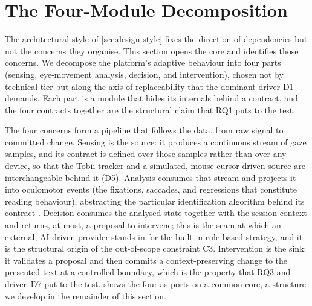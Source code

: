 \section{The Four-Module Decomposition}
\label{sec:design-modules}

The architectural style of \cref{sec:design-style} fixes the direction of dependencies but not the concerns they organise.
This section opens the core and identifies those concerns.
We decompose the platform's adaptive behaviour into four parts (sensing, eye-movement analysis, decision, and intervention), chosen not by technical tier but along the axis of replaceability that the dominant driver D1 demands.
Each part is a module that hides its internals behind a contract, and the four contracts together are the structural claim that RQ1 puts to the test.

The four concerns form a pipeline that follows the data, from raw signal to committed change.
Sensing is the source: it produces a continuous stream of gaze samples, and its contract is defined over those samples rather than over any device, so that the Tobii tracker and a simulated, mouse-cursor-driven source are interchangeable behind it (D5).
Analysis consumes that stream and projects it into oculomotor events (the fixations, saccades, and regressions that constitute reading behaviour), abstracting the particular identification algorithm behind its contract \cite{salvucci2000identifying}.
Decision consumes the analysed state together with the session context and returns, at most, a proposal to intervene; this is the seam at which an external, AI-driven provider stands in for the built-in rule-based strategy, and it is the structural origin of the out-of-scope constraint C3.
Intervention is the sink: it validates a proposal and then commits a context-preserving change to the presented text at a controlled boundary, which is the property that RQ3 and driver~D7 put to the test.
 shows the four as ports on a common core, a structure we develop in the remainder of this section.

